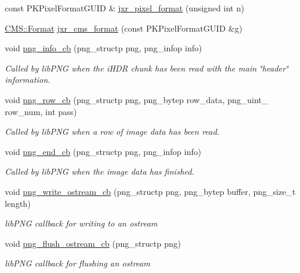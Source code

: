 \begin{DoxyCompactItemize}
\item 
const P\+K\+Pixel\+Format\+G\+U\+ID \& \hyperlink{namespace_photo_finish_ac746e7156705edaa931c9a5bbabbc4c9}{jxr\+\_\+pixel\+\_\+format} (unsigned int n)
\item 
\hyperlink{class_c_m_s_1_1_format}{C\+M\+S\+::\+Format} \hyperlink{namespace_photo_finish_ab4dd2e8b3cbf045782a20aba8c11486a}{jxr\+\_\+cms\+\_\+format} (const P\+K\+Pixel\+Format\+G\+U\+ID \&g)
\item 
void \hyperlink{namespace_photo_finish_abbdfd629905a885c93d81cd53d3caca2}{png\+\_\+info\+\_\+cb} (png\+\_\+structp png, png\+\_\+infop info)
\begin{DoxyCompactList}\small\item\em Called by lib\+P\+NG when the i\+H\+DR chunk has been read with the main \char`\"{}header\char`\"{} information. \end{DoxyCompactList}\item 
void \hyperlink{namespace_photo_finish_a406711757cc8db01c66461573c1154f0}{png\+\_\+row\+\_\+cb} (png\+\_\+structp png, png\+\_\+bytep row\+\_\+data, png\+\_\+uint\+\_ row\+\_\+num, int pass)
\begin{DoxyCompactList}\small\item\em Called by lib\+P\+NG when a row of image data has been read. \end{DoxyCompactList}\item 
void \hyperlink{namespace_photo_finish_a3ccb46c945cf009874ba8dbc24d15ac6}{png\+\_\+end\+\_\+cb} (png\+\_\+structp png, png\+\_\+infop info)
\begin{DoxyCompactList}\small\item\em Called by lib\+P\+NG when the image data has finished. \end{DoxyCompactList}\item 
void \hyperlink{namespace_photo_finish_a13f6602af999f016ea86b08858d9c704}{png\+\_\+write\+\_\+ostream\+\_\+cb} (png\+\_\+structp png, png\+\_\+bytep buffer, png\+\_\+size\+\_\+t length)
\begin{DoxyCompactList}\small\item\em lib\+P\+NG callback for writing to an ostream \end{DoxyCompactList}\item 
void \hyperlink{namespace_photo_finish_a0e24cee262cabfb1746e8e41a488e059}{png\+\_\+flush\+\_\+ostream\+\_\+cb} (png\+\_\+structp png)
\begin{DoxyCompactList}\small\item\em lib\+P\+NG callback for flushing an ostream \end{DoxyCompactList}\item 

\end{DoxyCompactItemize}
